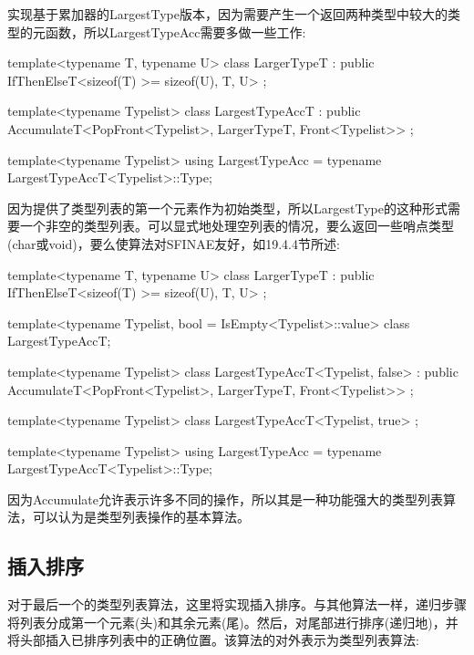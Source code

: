 实现基于累加器的LargestType版本，因为需要产生一个返回两种类型中较大的类型的元函数，所以LargestTypeAcc需要多做一些工作:

\begin{cpp}
template<typename T, typename U>
class LargerTypeT
: public IfThenElseT<sizeof(T) >= sizeof(U), T, U>
{
};

template<typename Typelist>
class LargestTypeAccT
: public AccumulateT<PopFront<Typelist>, LargerTypeT,
Front<Typelist>>
{
};

template<typename Typelist>
using LargestTypeAcc = typename LargestTypeAccT<Typelist>::Type;
\end{cpp}

因为提供了类型列表的第一个元素作为初始类型，所以LargestType的这种形式需要一个非空的类型列表。可以显式地处理空列表的情况，要么返回一些哨点类型(char或void)，要么使算法对SFINAE友好，如19.4.4节所述:

\begin{cpp}
template<typename T, typename U>
class LargerTypeT
: public IfThenElseT<sizeof(T) >= sizeof(U), T, U>
{
};

template<typename Typelist, bool = IsEmpty<Typelist>::value>
class LargestTypeAccT;

template<typename Typelist>
class LargestTypeAccT<Typelist, false>
: public AccumulateT<PopFront<Typelist>, LargerTypeT,
					Front<Typelist>>
{
};

template<typename Typelist>
class LargestTypeAccT<Typelist, true>
{
};

template<typename Typelist>
using LargestTypeAcc = typename LargestTypeAccT<Typelist>::Type;
\end{cpp}

因为Accumulate允许表示许多不同的操作，所以其是一种功能强大的类型列表算法，可以认为是类型列表操作的基本算法。

\subsection{插入排序}

对于最后一个的类型列表算法，这里将实现插入排序。与其他算法一样，递归步骤将列表分成第一个元素(头)和其余元素(尾)。然后，对尾部进行排序(递归地)，并将头部插入已排序列表中的正确位置。该算法的对外表示为类型列表算法:


